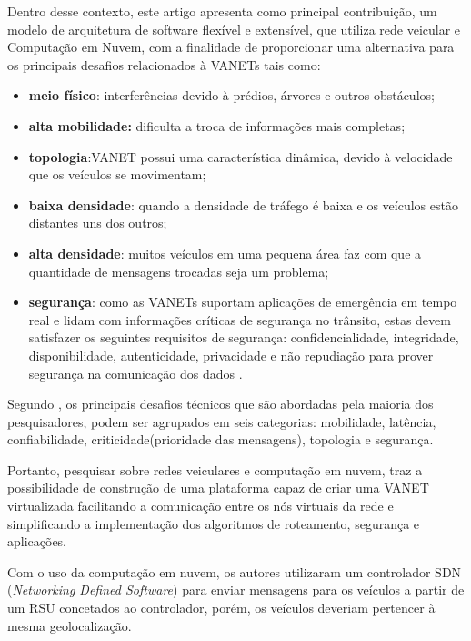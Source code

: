 \documentclass[
	12pt,				%
	oneside,			%
	a4paper,			%
	english,			%
	brazil				%
	]{abntex2ppgsi}
\begin{document}
Dentro desse contexto, este artigo apresenta como principal contribuição, um modelo de arquitetura de software flexível e extensível, que utiliza rede veicular  e  Computação em Nuvem, com a finalidade de proporcionar uma alternativa para os principais desafios relacionados à VANETs tais como: 

\begin{itemize}
	\item{\textbf{meio físico}: interferências devido à prédios,  árvores e outros obstáculos;}
	\item{\textbf{alta mobilidade:} dificulta a troca de informações mais completas; }
	\item{\textbf{topologia}:VANET possui uma característica dinâmica, devido à velocidade que os veículos se movimentam;}	
	\item{\textbf{baixa densidade}: quando a densidade de tráfego é baixa e os veículos estão distantes uns dos outros;}
	\item{\textbf{alta densidade}: muitos veículos em uma pequena área faz com que a quantidade de mensagens trocadas seja um problema;}
	\item{\textbf{segurança}: como as VANETs suportam aplicações de emergência em tempo real e lidam com informações	críticas de segurança no trânsito, estas devem satisfazer os seguintes requisitos de segurança: confidencialidade, integridade, disponibilidade, autenticidade, privacidade e não repudiação para prover segurança na comunicação dos dados \cite{samara2010security} \cite{matos2013analise}.}
\end{itemize} 

Segundo , os principais desafios técnicos que são abordadas pela maioria dos pesquisadores, podem ser agrupados em seis categorias: mobilidade, latência, confiabilidade, criticidade(prioridade das mensagens), topologia e segurança. 

Portanto, pesquisar sobre redes veiculares e computação em nuvem, traz a possibilidade de construção de uma plataforma capaz de criar uma VANET virtualizada facilitando a comunicação entre os nós virtuais da rede e simplificando a implementação dos algoritmos de roteamento, segurança e aplicações.

Com o uso da computação em nuvem, os autores   utilizaram um controlador SDN (\textit{Networking Defined Software}) para enviar mensagens para os veículos a partir de um RSU concetados ao controlador, porém, os veículos deveriam pertencer à mesma geolocalização.
\end{document}
